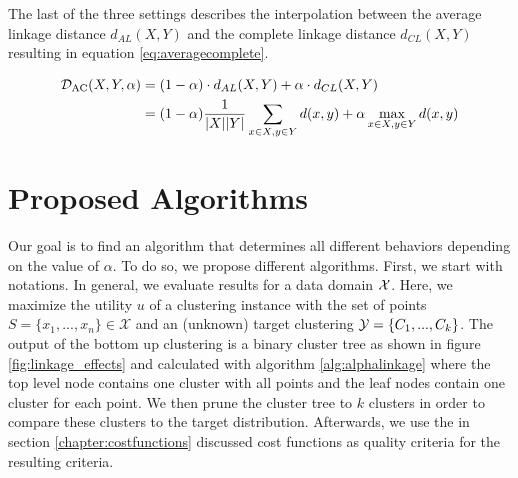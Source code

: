 The last of the three settings describes the interpolation between the average linkage distance $d_{AL}(X,Y)$ and the complete linkage distance $d_{CL}(X,Y)$ resulting in equation \ref{eq:averagecomplete}.

\begin{equation}
    \begin{aligned}
        \mathcal{D}_\text{AC}(X,Y,\alpha) &= (1 - \alpha) \cdot d_{AL}(X,Y) + \alpha \cdot d_{CL}(X,Y)\\
        &= (1 - \alpha) \frac{1}{|X| |Y|}\sum\limits_{x \in X, y \in Y} d(x,y) + \alpha \max\limits_{x \in X, y \in Y} d(x,y)
    \end{aligned}
    \label{eq:averagecomplete}
\end{equation}


\section{Proposed Algorithms}

Our goal is to find an algorithm that determines all different behaviors depending on the value of $\alpha$. To do so, we propose different algorithms. First, we start with notations. In general, we evaluate results for a data domain $\mathcal{X}$. Here, we maximize the utility $u$ of a clustering instance with the set of points $S = \{x_1, ..., x_n\} \in \mathcal{X}$ and an (unknown) target clustering $\mathcal{Y} = \{C_1, ..., C_k\}$. The output of the bottom up clustering is a binary cluster tree as shown in figure \ref{fig:linkage_effects} and calculated with algorithm \ref{alg:alphalinkage} where the top level node contains one cluster with all points and the leaf nodes contain one cluster for each point. We then prune the cluster tree to $k$ clusters in order to compare these clusters to the target distribution. Afterwards, we use the in section \ref{chapter:costfunctions} discussed cost functions as quality criteria for the resulting criteria.

